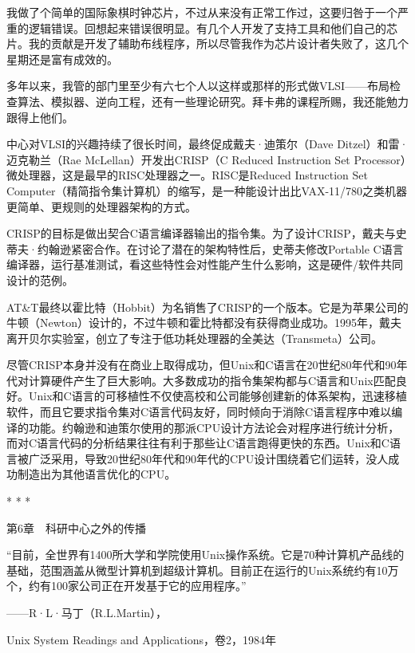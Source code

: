 \documentclass[a4paper,12pt,UTF8,twoside]{ctexbook}
\begin{document}
我做了个简单的国际象棋时钟芯片，不过从来没有正常工作过，这要归咎于一个严重的逻辑错误。回想起来错误很明显。有几个人开发了支持工具和他们自己的芯片。我的贡献是开发了辅助布线程序，所以尽管我作为芯片设计者失败了，这几个星期还是富有成效的。

多年以来，我管的部门里至少有六七个人以这样或那样的形式做VLSI——布局检查算法、模拟器、逆向工程，还有一些理论研究。拜卡弗的课程所赐，我还能勉力跟得上他们。

中心对VLSI的兴趣持续了很长时间，最终促成戴夫·迪策尔（Dave Ditzel）和雷·迈克勒兰（Rae McLellan）开发出CRISP（C Reduced Instruction Set Processor）微处理器，这是最早的RISC处理器之一。RISC是Reduced Instruction Set Computer（精简指令集计算机）的缩写，是一种能设计出比VAX-11/780之类机器更简单、更规则的处理器架构的方式。

CRISP的目标是做出契合C语言编译器输出的指令集。为了设计CRISP，戴夫与史蒂夫·约翰逊紧密合作。在讨论了潜在的架构特性后，史蒂夫修改Portable C语言编译器，运行基准测试，看这些特性会对性能产生什么影响，这是硬件/软件共同设计的范例。

AT\&T最终以霍比特（Hobbit）为名销售了CRISP的一个版本。它是为苹果公司的牛顿（Newton）设计的，不过牛顿和霍比特都没有获得商业成功。1995年，戴夫离开贝尔实验室，创立了专注于低功耗处理器的全美达（Transmeta）公司。

尽管CRISP本身并没有在商业上取得成功，但Unix和C语言在20世纪80年代和90年代对计算硬件产生了巨大影响。大多数成功的指令集架构都与C语言和Unix匹配良好。Unix和C语言的可移植性不仅使高校和公司能够创建新的体系架构，迅速移植软件，而且它要求指令集对C语言代码友好，同时倾向于消除C语言程序中难以编译的功能。约翰逊和迪策尔使用的那派CPU设计方法论会对程序进行统计分析，而对C语言代码的分析结果往往有利于那些让C语言跑得更快的东西。Unix和C语言被广泛采用，导致20世纪80年代和90年代的CPU设计围绕着它们运转，没人成功制造出为其他语言优化的CPU。



* * *









第6章　科研中心之外的传播


“目前，全世界有1400所大学和学院使用Unix操作系统。它是70种计算机产品线的基础，范围涵盖从微型计算机到超级计算机。目前正在运行的Unix系统约有10万个，约有100家公司正在开发基于它的应用程序。”

——R·L·马丁（R.L.Martin），

Unix System Readings and Applications，卷2，1984年
\end{document}
